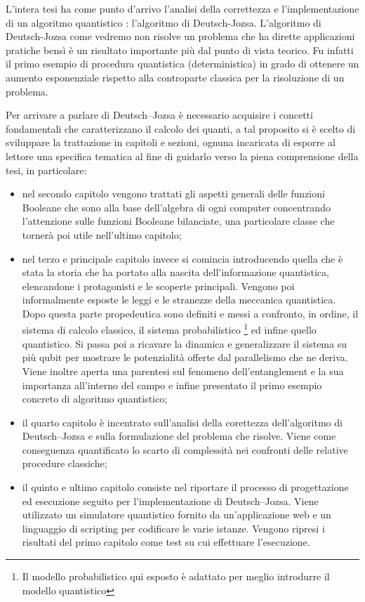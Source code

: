 \documentclass[12pt,a4paper,openright]{report}
\begin{document}
L'intera tesi ha come punto d'arrivo l'analisi della correttezza e l'implementazione di un algoritmo quantistico : l'algoritmo di Deutsch-Jozsa. L'algoritmo di Deutsch-Jozsa come vedremo non risolve un problema che ha dirette applicazioni
pratiche bensì è un risultato importante più dal punto di vista teorico. Fu infatti il primo esempio di procedura quantistica (deterministica) in grado di ottenere un aumento esponenziale rispetto alla controparte
classica per la risoluzione di un problema.\par
Per arrivare a parlare di Deutsch–Jozsa è necessario acquisire i concetti fondamentali che caratterizzano il calcolo dei quanti, a tal proposito si è scelto
di sviluppare la trattazione in capitoli e sezioni, ognuna incaricata di esporre al lettore una specifica tematica al fine di guidarlo verso la piena comprensione della tesi,
in particolare:     
\begin{itemize}
    \item nel secondo capitolo vengono trattati gli aspetti generali delle funzioni Booleane che sono alla base dell'algebra di ogni computer concentrando l'attenzione
          sulle funzioni Booleane bilanciate, una particolare classe che tornerà poi utile nell'ultimo capitolo;

    \item nel terzo e principale capitolo invece si comincia introducendo quella che è stata la storia che ha portato alla nascita dell'informazione quantistica,
          elencandone i protagonisti e le scoperte principali. Vengono poi informalmente esposte le leggi e le stranezze della meccanica quantistica. Dopo 
          questa parte propedeutica sono definiti e messi a confronto, in ordine, il sistema di calcolo classico, il sistema probabilistico \footnote{Il modello probabilistico
          qui esposto è adattato per meglio introdurre il modello quantistico} ed infine quello quantistico. Si passa poi a ricavare la dinamica e generalizzare
          il sistema su più qubit per mostrare le potenzialità offerte dal parallelismo che ne deriva. Viene inoltre aperta una parentesi sul fenomeno dell'entanglement
          e la sua importanza all'interno del campo e infine presentato il primo esempio concreto di algoritmo quantistico;
    
    \item il quarto capitolo è incentrato sull'analisi della corettezza dell'algoritmo di Deutsch–Jozsa e sulla formulazione del problema che risolve. Viene 
          come conseguenza quantificato lo scarto di complessità nei confronti delle relative procedure classiche;
          
    \item il quinto e ultimo capitolo consiste nel riportare il processo di progettazione ed esecuzione seguito per l'implementazione di Deutsch–Jozsa.
          Viene utilizzato un simulatore quantistico fornito da un'applicazione web e un linguaggio di scripting per codificare le varie istanze. Vengono ripresi
          i risultati del primo capitolo come test su cui effettuare l'esecuzione.
             
\end{itemize}     
\end{document}
